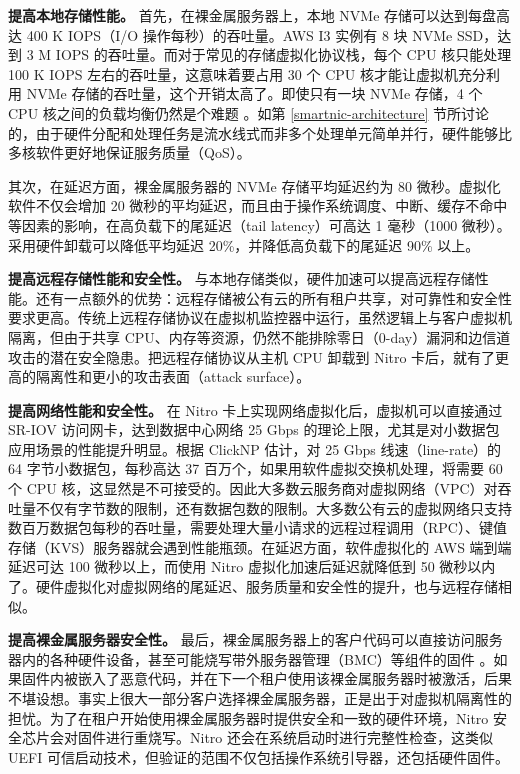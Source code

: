 \textbf{提高本地存储性能。}
首先，在裸金属服务器上，本地 NVMe 存储可以达到每盘高达 400 K IOPS（I/O 操作每秒）的吞吐量。AWS I3 实例有 8 块 NVMe SSD，达到 3 M IOPS 的吞吐量。而对于常见的存储虚拟化协议栈，每个 CPU 核只能处理 100 K IOPS 左右的吞吐量，这意味着要占用 30 个 CPU 核才能让虚拟机充分利用 NVMe 存储的吞吐量，这个开销太高了。即使只有一块 NVMe 存储，4 个 CPU 核之间的负载均衡仍然是个难题 \cite{li2017kv}。如第 \ref{smartnic-architecture} 节所讨论的，由于硬件分配和处理任务是流水线式而非多个处理单元简单并行，硬件能够比多核软件更好地保证服务质量（QoS）。

其次，在延迟方面，裸金属服务器的 NVMe 存储平均延迟约为 80 微秒。虚拟化软件不仅会增加 20 微秒的平均延迟，而且由于操作系统调度、中断、缓存不命中等因素的影响，在高负载下的尾延迟（tail latency）可高达 1 毫秒（1000 微秒）。采用硬件卸载可以降低平均延迟 20\%，并降低高负载下的尾延迟 90\% 以上。

\textbf{提高远程存储性能和安全性。}
与本地存储类似，硬件加速可以提高远程存储性能。还有一点额外的优势：远程存储被公有云的所有租户共享，对可靠性和安全性要求更高。传统上远程存储协议在虚拟机监控器中运行，虽然逻辑上与客户虚拟机隔离，但由于共享 CPU、内存等资源，仍然不能排除零日（0-day）漏洞和边信道攻击的潜在安全隐患。把远程存储协议从主机 CPU 卸载到 Nitro 卡后，就有了更高的隔离性和更小的攻击表面（attack surface）。

\textbf{提高网络性能和安全性。}
在 Nitro 卡上实现网络虚拟化后，虚拟机可以直接通过 SR-IOV 访问网卡，达到数据中心网络 25 Gbps 的理论上限，尤其是对小数据包应用场景的性能提升明显。根据 ClickNP \cite{li2016clicknp} 估计，对 25 Gbps 线速（line-rate）的 64 字节小数据包，每秒高达 37 百万个，如果用软件虚拟交换机处理，将需要 60 个 CPU 核，这显然是不可接受的。因此大多数云服务商对虚拟网络（VPC）对吞吐量不仅有字节数的限制，还有数据包数的限制。大多数公有云的虚拟网络只支持数百万数据包每秒的吞吐量，需要处理大量小请求的远程过程调用（RPC）、键值存储（KVS）服务器就会遇到性能瓶颈。在延迟方面，软件虚拟化的 AWS 端到端延迟可达 100 微秒以上，而使用 Nitro 虚拟化加速后延迟就降低到 50 微秒以内了。硬件虚拟化对虚拟网络的尾延迟、服务质量和安全性的提升，也与远程存储相似。

\textbf{提高裸金属服务器安全性。}
最后，裸金属服务器上的客户代码可以直接访问服务器内的各种硬件设备，甚至可能烧写带外服务器管理（BMC）等组件的固件 \cite{bare-metal-security}。如果固件内被嵌入了恶意代码，并在下一个租户使用该裸金属服务器时被激活，后果不堪设想。事实上很大一部分客户选择裸金属服务器，正是出于对虚拟机隔离性的担忧。为了在租户开始使用裸金属服务器时提供安全和一致的硬件环境，Nitro 安全芯片会对固件进行重烧写。Nitro 还会在系统启动时进行完整性检查，这类似 UEFI 可信启动技术，但验证的范围不仅包括操作系统引导器，还包括硬件固件。

